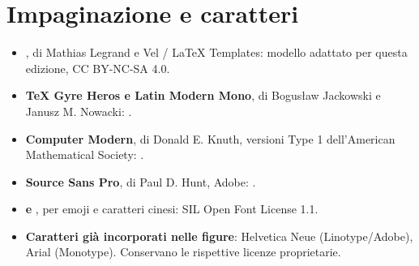 \section*{Impaginazione e caratteri}
\begin{itemize}[leftmargin=*,itemsep=3pt,topsep=3pt,parsep=0pt]
\item \textbf{}, di Mathias Legrand e Vel / LaTeX Templates: modello adattato per questa edizione, CC BY-NC-SA 4.0.
\item \textbf{TeX Gyre Heros e Latin Modern Mono}, di Bogusław Jackowski e Janusz M. Nowacki: .
\item \textbf{Computer Modern}, di Donald E. Knuth, versioni Type 1 dell’American Mathematical Society: .
\item \textbf{Source Sans Pro}, di Paul D. Hunt, Adobe: .
\item \textbf{ e }, per emoji e caratteri cinesi: SIL Open Font License 1.1.
\item \textbf{Caratteri già incorporati nelle figure}: Helvetica Neue (Linotype/Adobe), Arial (Monotype). Conservano le rispettive licenze proprietarie.
\end{itemize}

\endgroup
